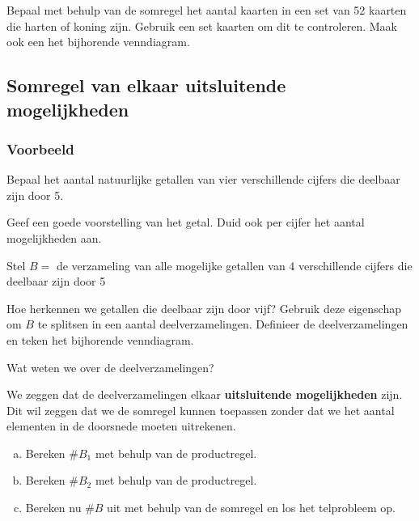 \documentclass[12pt,twoside]{article}
\begin{document}
\begin{oefening}
Bepaal met behulp van de somregel het aantal kaarten in een set van 52 kaarten die harten of koning zijn. Gebruik een set kaarten om dit te controleren. Maak ook een het bijhorende venndiagram.
\end{oefening}

\subsection{Somregel van elkaar uitsluitende mogelijkheden}

\subsubsection*{Voorbeeld}

Bepaal het aantal natuurlijke getallen van vier verschillende cijfers die deelbaar zijn door 5.

\begin{oefening}
Geef een goede voorstelling van het getal. Duid ook per cijfer het aantal mogelijkheden aan.
\end{oefening}

Stel $B=$ de verzameling van alle mogelijke getallen van 4 verschillende cijfers die deelbaar zijn door 5

\begin{oefening}
Hoe herkennen we getallen die deelbaar zijn door vijf? Gebruik deze eigenschap om $B$ te splitsen in een aantal deelverzamelingen. Definieer de deelverzamelingen en teken het bijhorende venndiagram.
\vspace*{4cm}
\end{oefening}

\begin{oefening}
Wat weten we over de deelverzamelingen?
\end{oefening}

We zeggen dat de deelverzamelingen elkaar {\bf uitsluitende mogelijkheden} zijn. Dit wil zeggen dat we de somregel kunnen toepassen zonder dat we het aantal elementen in de doorsnede moeten uitrekenen.

\begin{oefening}
\begin{enumerate}[(a)]
  \item Bereken $\#B_1$ met behulp van de productregel.
  \item Bereken $\#B_2$ met behulp van de productregel.
  \item Bereken nu $\#B$ uit met behulp van de somregel en los het telprobleem op.
\end{enumerate}
\end{oefening}
\end{document}
